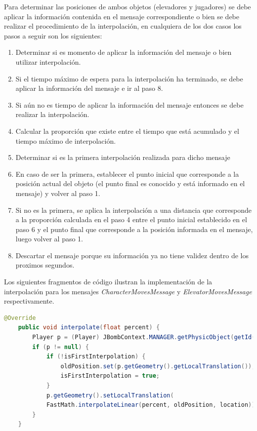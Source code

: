 \documentclass[a4paper,12pt,openany,oneside]{book}
\begin{document}
Para determinar las posiciones de ambos objetos (elevadores y jugadores) se debe aplicar la información contenida en el mensaje correspondiente o bien se debe realizar el procedimiento de la interpolación, en cualquiera de los dos casos los pasos a seguir son los siguientes:
\begin{enumerate}
\item Determinar si es momento de aplicar la información del mensaje o bien utilizar interpolación.
\item Si el tiempo máximo de espera para la interpolación ha terminado, se debe aplicar la información del mensaje e ir al paso 8.
\item Si aún no es tiempo de aplicar la información del mensaje entonces se debe realizar la interpolación.
\item Calcular la proporción que existe entre el tiempo que está acumulado y el tiempo máximo de interpolación.
\item Determinar si es la primera interpolación realizada para dicho mensaje
\item En caso de ser la primera, establecer el punto inicial que corresponde a la posición actual del objeto (el punto final es conocido y está informado en el mensaje) y volver al paso 1.
\item Si no es la primera, se aplica la interpolación a una distancia que corresponde a la proporción calculada en el paso 4 entre el punto inicial establecido en el paso 6 y el punto final que corresponde a la posición informada en el mensaje, luego volver al paso 1.
\item Descartar el mensaje porque su información ya no tiene validez dentro de los proximos segundos.
\end{enumerate}
Los siguientes fragmentos de código ilustran la implementación de la interpolación para los mensajes \textit{CharacterMovesMessage} y \textit{ElevatorMovesMessage} respectivamente.
\begin{codigo}
\begin{lstlisting}[language=Java,frame=single,basicstyle=\scriptsize,caption={Interpolación en \textit{CharacterMovesMessage}}]
	@Override
    public void interpolate(float percent) {
        Player p = (Player) JBombContext.MANAGER.getPhysicObject(getId());
        if (p != null) {
            if (!isFirstInterpolation) {
                oldPosition.set(p.getGeometry().getLocalTranslation());
                isFirstInterpolation = true;
            }
            p.getGeometry().setLocalTranslation(
            FastMath.interpolateLinear(percent, oldPosition, location));
        }
    }
\end{lstlisting}
\end{codigo}
\end{document}

